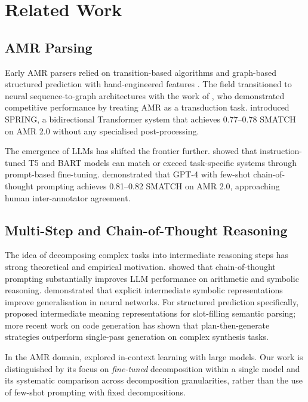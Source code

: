 \documentclass[11pt,a4paper]{article}
\begin{document}
\section{Related Work}
\label{sec:related}

\subsection{AMR Parsing}

Early AMR parsers relied on transition-based algorithms \citep{wang2015broad}
and graph-based structured prediction with hand-engineered features
\citep{damonte2017incremental}. The field transitioned to neural
sequence-to-graph architectures with the work of \citet{zhang2019amr}, who
demonstrated competitive performance by treating AMR as a transduction task.
\citet{bevilacqua2021spring} introduced SPRING, a bidirectional Transformer
system that achieves 0.77--0.78 SMATCH on AMR 2.0 without any specialised
post-processing.

The emergence of LLMs has shifted the frontier further. \citet{xie2023universal}
showed that instruction-tuned T5 and BART models can match or exceed
task-specific systems through prompt-based fine-tuning. \citet{li2023gpt}
demonstrated that GPT-4 with few-shot chain-of-thought prompting achieves
0.81--0.82 SMATCH on AMR 2.0, approaching human inter-annotator agreement.

\subsection{Multi-Step and Chain-of-Thought Reasoning}

The idea of decomposing complex tasks into intermediate reasoning steps has
strong theoretical and empirical motivation. \citet{wei2022chain} showed that
chain-of-thought prompting substantially improves LLM performance on arithmetic
and symbolic reasoning. \citet{nye2021show} demonstrated that explicit
intermediate symbolic representations improve generalisation in neural networks.
For structured prediction specifically, \citet{jia2016semantic} proposed
intermediate meaning representations for slot-filling semantic parsing; more
recent work on code generation \citep{guo2020towards} has shown that
plan-then-generate strategies outperform single-pass generation on complex
synthesis tasks.

In the AMR domain, \citet{ulrich2023amr} explored in-context learning with
large models. Our work is distinguished by its focus on \emph{fine-tuned}
decomposition within a single model and its systematic comparison across
decomposition granularities, rather than the use of few-shot prompting with
fixed decompositions.
\end{document}
